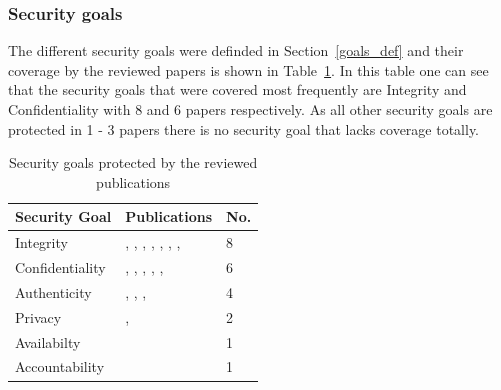 \documentclass[runningheads]{llncs}
\begin{document}
\subsubsection{Security goals}\label{goals}
The different security goals were definded in Section~\ref{goals_def} and their coverage by the reviewed papers is shown in Table~\ref{goals_table}. In this table one can see that the security goals
that were covered most frequently are Integrity and Confidentiality with 8 and 6 papers respectively. As all other security goals are protected in 1 - 3 papers there is no security
goal that lacks coverage totally.
\begin{table}
    \centering
    \caption{Security goals protected by the reviewed publications}
    \begin{tabular}{ | l | l | l | }
        \hline
        \textbf{Security Goal} & \textbf{Publications}                                                                                                                                                            & \textbf{No. } \\
        \hline
        \hline
        Integrity              & \cite{Leitner2013719}, \cite{Mardani2013}, \cite{Accorsi20131462}, \cite{Mishra2018613}, \cite{MozafariMehr2022397}, \cite{Breitmayer202411}, \cite{Sarno2020}, \cite{MacAk2020} & 8                            \\
        \hline
        Confidentiality        & \cite{Leitner2013719}, \cite{Accorsi20131462}, \cite{Mishra2018613}, \cite{MozafariMehr2022397}, \cite{Breitmayer202411}, \cite{MacAk2020}                                       & 6                            \\
        \hline
        Authenticity           & \cite{Mardani2013}, \cite{Accorsi20131462}, \cite{Mishra2018613}, \cite{MozafariMehr2022397}                                                                                     & 4                            \\
        \hline
        Privacy                & \cite{Zaman20192982}, \cite{MozafariMehr202182}                                                                                                                                  & 2                            \\
        \hline
        Availabilty            & \cite{Mishra2018613}                                                                                                                                                             & 1                            \\
        \hline
        Accountability         & \cite{Mardani2013}                                                                                                                                                               & 1                            \\
        \hline
    \end{tabular}
    \label{goals_table}
\end{table}
\end{document}

